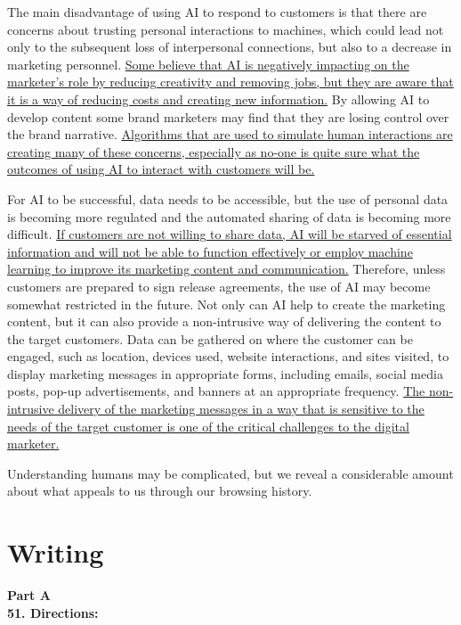 The main disadvantage of using AI to respond to customers is that there are concerns about trusting personal interactions to machines, which could lead not only to the subsequent loss of interpersonal connections, but also to a decrease in marketing personnel. \transnum  \uline{  Some believe that AI is negatively impacting on the marketer's role by reducing creativity and removing jobs, but they are aware that it is a way of reducing costs and creating new information.} By allowing AI to develop content some brand marketers may find that they are losing control over the brand narrative. \transnum  \uline{ Algorithms that are used to simulate human interactions are creating many of these concerns, especially as no-one is quite sure what the outcomes of using AI to interact with customers will be.}

For AI to be successful, data needs to be accessible, but the use of personal data is becoming more regulated and the automated sharing of data is becoming more difficult. \transnum  \uline{  If customers are not willing to share data, AI will be starved of essential information and will not be able to function effectively or employ machine learning to improve its marketing content and communication.} Therefore, unless customers are prepared to sign release agreements, the use of AI may become somewhat restricted in the future. Not only can AI help to create the marketing content, but it can also provide a non-intrusive way of delivering the content to the target customers. Data can be gathered on where the customer can be engaged, such as location, devices used, website interactions, and sites visited, to display marketing messages in appropriate forms, including emails, social media posts, pop-up advertisements, and banners at an appropriate frequency. \transnum  \uline{The non-intrusive delivery of the marketing messages in a way that is sensitive to the needs of the target customer is one of the critical challenges to the digital marketer.}

Understanding humans may be complicated, but we reveal a considerable amount about what appeals to us through our browsing history.



\newpage
\section{Writing}


\noindent
\textbf{Part A}\\
\textbf{51. Directions:}

